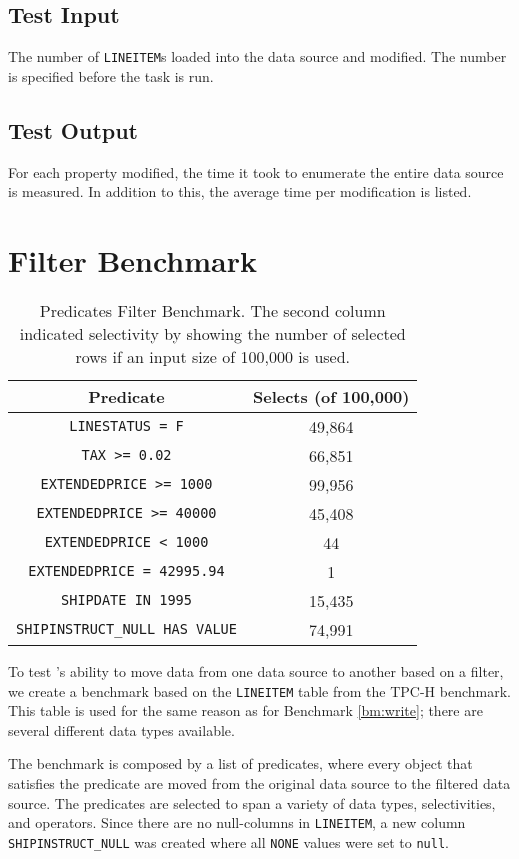 \subsection{Test Input}
\label{sub:Test Input}
The number of \texttt{LINEITEM}s loaded into the data source and modified. The number is specified before the task is run.

\subsection{Test Output}
\label{sub:Test Output}
For each property modified, the time it took to enumerate the entire data source is measured. In addition to this, the average time per modification is listed.

\section{Filter Benchmark}
\label{bm:filter}
\begin{table}
    \centering
    \begin{tabular}{c | c}
        Predicate & Selects (of 100,000) \\
        \hline
        \hline
        \texttt{LINESTATUS = F} & 49,864 \\
        \texttt{TAX >= 0.02} & 66,851 \\
        \texttt{EXTENDEDPRICE >= 1000} & 99,956 \\
        \texttt{EXTENDEDPRICE >= 40000} & 45,408\\
        \texttt{EXTENDEDPRICE < 1000} & 44 \\
        \texttt{EXTENDEDPRICE = 42995.94} & 1 \\
        \texttt{SHIPDATE IN 1995} & 15,435 \\
        \texttt{SHIPINSTRUCT\_NULL HAS VALUE} & 74,991 \\
    \end{tabular}
    \caption{Predicates Filter Benchmark. The second column indicated selectivity by showing the number of selected rows if an input size of 100,000 is used.}
    \label{tab:Filter Test}
\end{table}
To test \gap's ability to move data from one data source to another based on a filter, we create a benchmark based on the \texttt{LINEITEM} table from the TPC-H benchmark. This table is used for the same reason as for Benchmark \ref{bm:write}; there are several different data types available. 

The benchmark is composed by a list of predicates, where every object that satisfies the predicate are moved from the original data source to the filtered data source. The predicates are selected to span a variety of data types, selectivities, and operators. Since there are no null-columns in \texttt{LINEITEM}, a new column \texttt{SHIPINSTRUCT\_NULL} was created where all \texttt{NONE} values were set to \texttt{null}.

